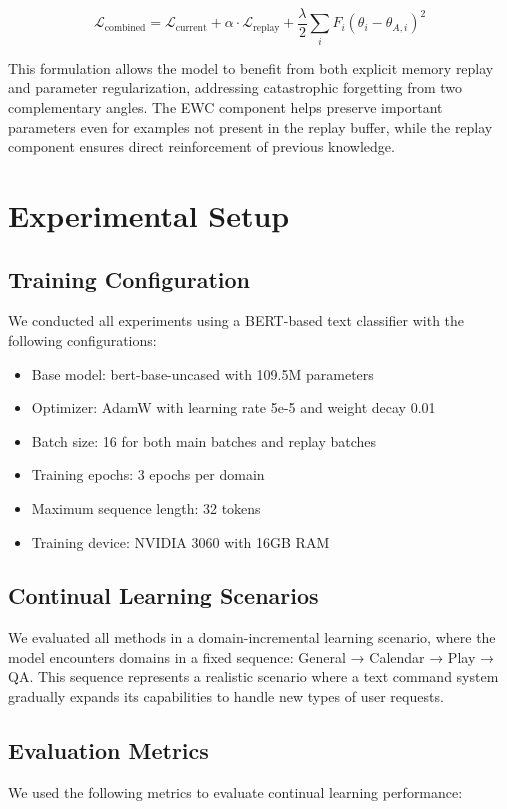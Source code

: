\documentclass[conference]{IEEEtran}
\begin{document}
\begin{equation}
\mathcal{L}_{\text{combined}} = \mathcal{L}_{\text{current}} + \alpha \cdot \mathcal{L}_{\text{replay}} + \frac{\lambda}{2} \sum_i F_i (\theta_i - \theta_{A,i})^2
\end{equation}

This formulation allows the model to benefit from both explicit memory replay and parameter regularization, addressing catastrophic forgetting from two complementary angles. The EWC component helps preserve important parameters even for examples not present in the replay buffer, while the replay component ensures direct reinforcement of previous knowledge.

\section{Experimental Setup}
\subsection{Training Configuration}
We conducted all experiments using a BERT-based text classifier with the following configurations:

\begin{itemize}
    \item Base model: bert-base-uncased with 109.5M parameters
    \item Optimizer: AdamW with learning rate 5e-5 and weight decay 0.01
    \item Batch size: 16 for both main batches and replay batches
    \item Training epochs: 3 epochs per domain
    \item Maximum sequence length: 32 tokens
    \item Training device: NVIDIA 3060 with 16GB RAM
\end{itemize}

\subsection{Continual Learning Scenarios}
We evaluated all methods in a domain-incremental learning scenario, where the model encounters domains in a fixed sequence: General → Calendar → Play → QA. This sequence represents a realistic scenario where a text command system gradually expands its capabilities to handle new types of user requests.

\subsection{Evaluation Metrics}
We used the following metrics to evaluate continual learning performance:
\end{document}
